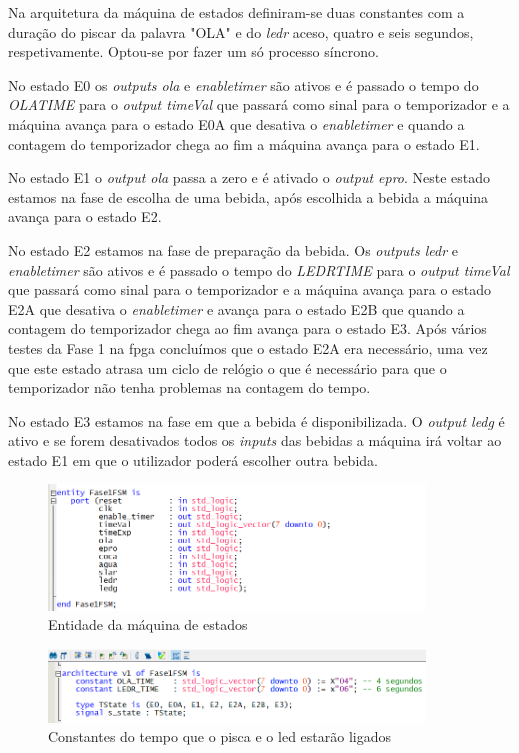 \documentclass{report}
\begin{document}
Na arquitetura da máquina de estados definiram-se duas constantes com a duração do piscar da palavra "OLA" e do \textit{ledr} aceso, quatro e seis segundos, respetivamente.
Optou-se por fazer um só processo síncrono. 

No estado E0 os \textit{outputs ola} e \textit{enable\textunderscore timer} são ativos e é passado o tempo do \textit{OLA\textunderscore TIME} para o \textit{output timeVal} que passará como sinal para o temporizador e a máquina avança para o estado E0A que desativa o \textit{enable\textunderscore timer} e quando a contagem do temporizador chega ao fim a máquina avança para o estado E1.

No estado E1 o \textit{output ola} passa a zero e é ativado o \textit{output epro}. Neste estado estamos na fase de escolha de uma bebida, após escolhida a bebida a máquina avança para o estado E2.

No estado E2 estamos na fase de preparação da bebida. Os \textit{outputs ledr} e \textit{enable\textunderscore timer} são ativos e é passado o tempo do \textit{LEDR\textunderscore TIME} para o \textit{output timeVal} que passará como sinal para o temporizador e a máquina avança para o estado E2A que desativa o \textit{enable\textunderscore timer} e avança para o estado E2B que quando a contagem do temporizador chega ao fim avança para o estado E3. Após vários testes da Fase 1 na \ac{fpga} concluímos que o estado E2A era necessário, uma vez que este estado atrasa um ciclo de relógio o que é necessário para que o temporizador não tenha problemas na contagem do tempo.

No estado E3 estamos na fase em que a bebida é disponibilizada. O \textit{output ledg} é ativo e se forem desativados todos os \textit{inputs} das bebidas a máquina irá voltar ao estado E1 em que o utilizador poderá escolher outra bebida.

\begin{figure}[H]
    \centering
    \includegraphics[width = 10cm]{Fase1FSMentity.png}
    \caption{Entidade da máquina de estados}
    \label{fig:entityMáquinadeestados}
\end{figure}

\begin{figure}[H]
    \centering
    \includegraphics[width = 10cm]{Time.png}
    \caption{Constantes do tempo que o pisca e o led estarão ligados}
    \label{fig:Time}
\end{figure}
\end{document}
